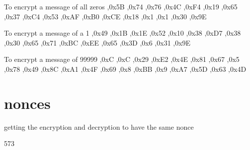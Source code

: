 To encrypt a message of all zeros
,0x5B ,0x74 ,0x76 ,0x4C ,0xF4 ,0x19 ,0x65 ,0x37
 ,0xC4 ,0x53 ,0xAF ,0xB0 ,0xCE ,0x18 ,0x1 ,0x1
 ,0x30 ,0x9E

To encrypt a message of a 1
,0x49 ,0x1B ,0x1E ,0x52 ,0x10 ,0x38 ,0xD7 ,0x38
 ,0x30 ,0x65 ,0x71 ,0xBC ,0xEE ,0x65 ,0x3D ,0x6
 ,0x31 ,0x9E

To encrypt a message of 99999
,0xC ,0xC ,0x29 ,0xE2 ,0x4E ,0x81 ,0x67 ,0x5
 ,0x78 ,0x49 ,0x8C ,0xA1 ,0x4F ,0x69 ,0x8 ,0xBB
 ,0x9 ,0xA7 ,0x5D ,0x63 ,0x4D

\section{nonces}

getting the encryption and decryption to have the same nonce


573